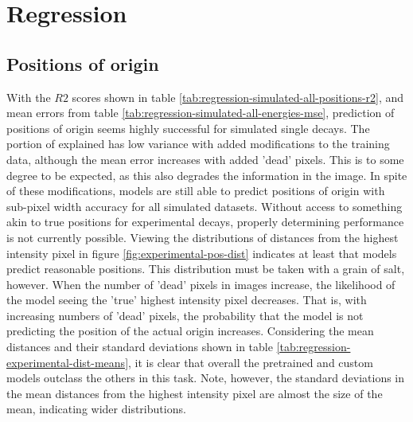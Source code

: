 \section{Regression}
\subsection{Positions of origin}
With the $R2$ scores shown in table \ref{tab:regression-simulated-all-positions-r2},
and mean errors from table \ref{tab:regression-simulated-all-energies-mse}, prediction
of positions of origin seems highly successful for simulated single decays. The portion
of explained has low variance with added modifications to the training data, although
the mean error increases with added 'dead' pixels. This is to some degree to be expected,
as this also degrades the information in the image. In spite of these modifications, models
are still able to predict positions of origin with sub-pixel width accuracy for all simulated
datasets. Without access to something akin to true positions for experimental decays, properly
determining performance is not currently possible. Viewing the distributions of distances from
the highest intensity pixel in figure \ref{fig:experimental-pos-dist} indicates at least that models
predict reasonable positions. This distribution must be taken with a grain of salt, however. When the
number of 'dead' pixels in images increase, the likelihood of the model seeing the 'true' highest intensity
pixel decreases. That is, with increasing numbers of 'dead' pixels, the probability that the model is not
predicting the position of the actual origin increases. Considering the mean distances and their standard deviations
shown in table \ref{tab:regression-experimental-dist-means}, it is clear that overall the pretrained
and custom models outclass the others in this task. Note, however, the standard deviations in the mean
distances from the highest intensity pixel are almost the size of the mean, indicating wider distributions.
